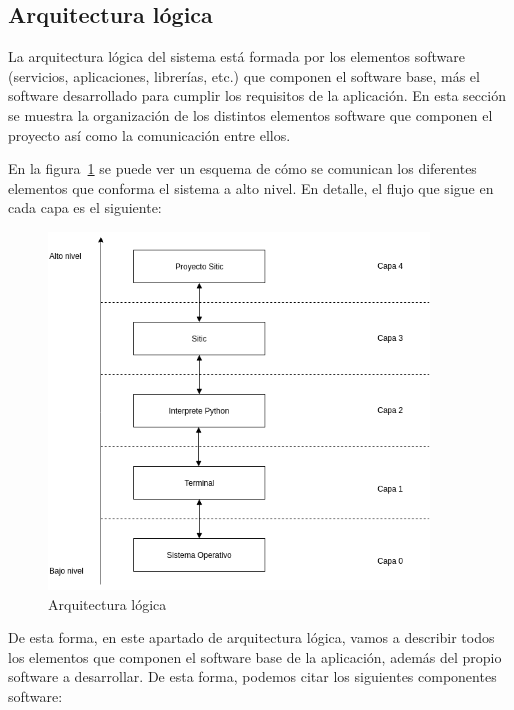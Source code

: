 \subsection{Arquitectura lógica}

La arquitectura lógica del sistema está formada por los elementos software
(servicios, aplicaciones, librerías, etc.) que componen el software base,
más el software desarrollado para cumplir los requisitos de la aplicación. En esta
sección se muestra la organización de los distintos elementos software que
componen el proyecto así como la comunicación entre ellos.

En la figura~\ref{fig:arquitectura-logica}  se puede ver un esquema de cómo se comunican los diferentes
elementos que conforma el sistema a alto nivel. En detalle, el flujo que sigue
en cada capa es el siguiente:

\begin{figure}[htbp]
    \centering
    \includegraphics[width=0.9\textwidth]{5_diseno/arquitectura_logica}
    \caption{Arquitectura lógica}
    \label{fig:arquitectura-logica}
\end{figure}

De esta forma, en este apartado de arquitectura lógica, vamos a describir todos los elementos
que componen el software base de la aplicación, además del propio software a desarrollar.
De esta forma, podemos citar los siguientes componentes software:

